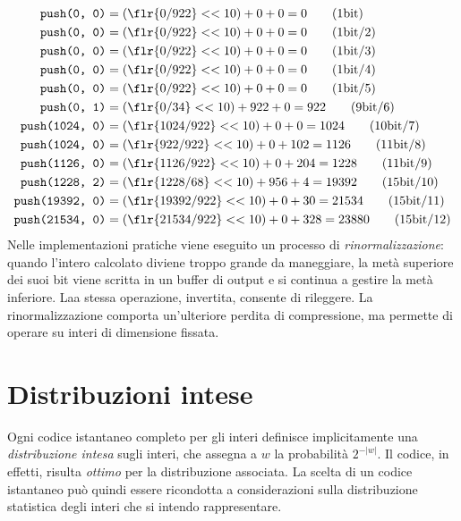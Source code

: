 \begin{align*}
\texttt{push(0, 0)} &= (\flr{0 / 922} << 10) + 0 + 0 = 0 \qquad (1 \textnormal{bit})\\
\texttt{push(0, 0)} &= (\flr{0 / 922} << 10) + 0 + 0 = 0 \qquad (1 \textnormal{bit} / 2)\\
\texttt{push(0, 0)} &= (\flr{0 / 922} << 10) + 0 + 0 = 0  \qquad (1 \textnormal{bit} / 3)\\
\texttt{push(0, 0)} &= (\flr{0 / 922} << 10) + 0 + 0 = 0 \qquad (1 \textnormal{bit} / 4)\\
\texttt{push(0, 0)} &= (\flr{0 / 922} << 10) + 0 + 0 = 0 \qquad (1 \textnormal{bit} / 5) \\
\texttt{push(0, 1)} &= (\flr{0 / 34} << 10) + 922 + 0 = 922 \qquad (9 \textnormal{bit} / 6) \\
\texttt{push(1024, 0)} &= (\flr{1024 / 922} << 10) + 0 + 0 = 1024 \qquad (10 \textnormal{bit} / 7) \\
\texttt{push(1024, 0)} &= (\flr{922 / 922} << 10) + 0 + 102 = 1126 \qquad (11 \textnormal{bit} / 8) \\
\texttt{push(1126, 0)} &= (\flr{1126 / 922} << 10) + 0 + 204 = 1228 \qquad (11 \textnormal{bit} / 9) \\
\texttt{push(1228, 2)} &= (\flr{1228 / 68} << 10) + 956 + 4 = 19392 \qquad (15 \textnormal{bit} / 10) \\
\texttt{push(19392, 0)} &= (\flr{19392 / 922} << 10) + 0 + 30 = 21534 \qquad (15 \textnormal{bit} / 11) \\
\texttt{push(21534, 0)} &= (\flr{21534 / 922} << 10) + 0 + 328 = 23880 \qquad (15 \textnormal{bit} / 12)
\end{align*}
Nelle implementazioni pratiche viene eseguito un processo di \textit{rinormalizzazione}: quando l'intero calcolato diviene troppo grande da maneggiare, la metà superiore dei suoi bit viene scritta in un buffer di output e si continua a gestire la metà inferiore. Laa stessa operazione, invertita, consente di rileggere. La rinormalizzazione comporta un'ulteriore perdita di compressione, ma permette di operare su interi di dimensione fissata.
\section{Distribuzioni intese}
Ogni codice istantaneo completo per gli interi definisce implicitamente una \textit{distribuzione intesa} sugli interi, che assegna a $w$ la probabilità $2^{-|w|}$. Il codice, in effetti, risulta \textit{ottimo} per la distribuzione associata. La scelta di un codice istantaneo può quindi essere ricondotta a considerazioni sulla distribuzione statistica degli interi che si intendo rappresentare.

